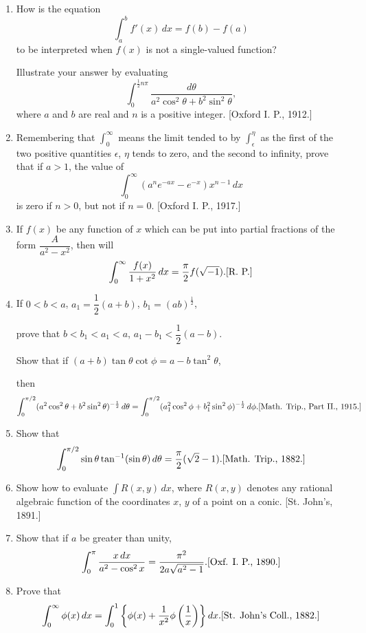 \documentclass[11pt, a4paper]{article}
\newcommand{\source}[1]{\hfill\textnormal{[#1]}}
\begin{document}
\begin{enumerate}[leftmargin=2em]
\item How is the equation
\[
\int_a^b f'(x)\,dx=f(b)-f(a)
\]
to be interpreted when $f(x)$ is not a single-valued function?

Illustrate your answer by evaluating
\[
\int_0^{\frac12n\pi} \dfrac{d\theta}{a^2\cos^2\theta+b^2\sin^2\theta},
\]
where $a$ and $b$ are real and $n$ is a positive integer. \source{Oxford I. P., 1912.}

\item Remembering that $\displaystyle\int_0^\infty$ means the limit tended to by $\displaystyle\int_\epsilon^\eta$ as the first of the two positive quantities $\epsilon$, $\eta$ tends to zero, and the second to infinity, prove that if $a>1$, the value of
\[
\int_0^\infty (a^ne^{-ax}-e^{-x})x^{n-1}\,dx
\]
is zero if $n>0$, but not if $n=0$. \source{Oxford I. P., 1917.}

\item If $f(x)$ be any function of $x$ which can be put into partial fractions of the form $\dfrac{A}{a^2-x^2}$, then will
\[
\int_0^\infty \dfrac{f(x)}{1+x^2}\,dx=\dfrac{\pi}{2}f(\sqrt{-1}). \source{R. P.}
\]

\item If $0<b<a$, $a_1=\dfrac12(a+b)$, $b_1=(ab)^{\frac12}$,

prove that $b<b_1<a_1<a$, $a_1-b_1<\dfrac12(a-b)$.

Show that if $(a+b)\tan\theta\cot\phi=a-b\tan^2\theta$,

then
\[
\int_0^{\pi/2}(a^2\cos^2\theta+b^2\sin^2\theta)^{-\frac12}\,d\theta=\int_0^{\pi/2}(a_1^2\cos^2\phi+b_1^2\sin^2\phi)^{-\frac12}\,d\phi. \source{Math. Trip., Part II., 1915.}
\]

\item Show that
\[
\int_0^{\pi/2} \sin\theta\tan^{-1}(\sin\theta)\,d\theta=\dfrac{\pi}{2}(\sqrt2-1). \source{Math. Trip., 1882.}
\]

\item Show how to evaluate $\displaystyle\int R(x,y)\,dx$, where $R(x,y)$ denotes any rational algebraic function of the coordinates $x$, $y$ of a point on a conic. \source{St. John's, 1891.}

\item Show that if $a$ be greater than unity,
\[
\int_0^\pi \dfrac{x\,dx}{a^2-\cos^2x}=\dfrac{\pi^2}{2a\sqrt{a^2-1}}. \source{Oxf. I. P., 1890.}
\]

\item Prove that
\[
\int_0^\infty \phi(x)\,dx=\int_0^1 \left\{\phi(x)+\dfrac{1}{x^2}\phi\left(\dfrac1x\right)\right\}dx. \source{St. John's Coll., 1882.}
\]


\end{enumerate}
\end{document}
